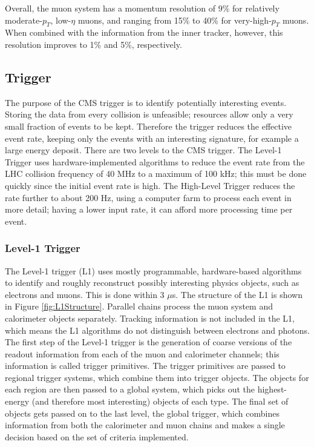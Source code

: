 Overall, the muon system has a momentum resolution 
of 9\% for relatively moderate-$p_T$, low-$\eta$ muons, 
and ranging from 15\% to 40\% for very-high-$p_T$ muons.  
When combined with the information from the inner tracker, 
however, this resolution improves to 
1\% and 5\%, respectively.  

\subsection{Trigger}
\label{exp:trigger}
The purpose of the CMS trigger is to 
identify potentially interesting events.  
Storing the data from every collision is unfeasible; 
resources allow only a very small fraction of events to be kept.  
Therefore the trigger reduces the effective event rate, 
keeping only the events with an interesting signature, 
for example a large energy deposit.  
There are two levels to the CMS trigger.  
The Level-1 Trigger uses hardware-implemented algorithms to 
reduce the event rate from the LHC collision frequency of 40 MHz 
to a maximum of 100 kHz; 
this must be done quickly since the initial event rate is high. 
The High-Level Trigger reduces the rate further to about 200 Hz, %
using a computer farm to process each event in more detail; 
having a lower input rate, it can afford more processing time per event.  


\subsubsection{Level-1 Trigger}
\label{exp:L1}

The Level-1 trigger (L1) \cite{TriggerTDR} 
uses mostly programmable, hardware-based algorithms 
to identify and roughly reconstruct possibly interesting physics objects, 
such as electrons and muons.  
This is done within 3 $\mu$s.  
The structure of the L1 is shown in Figure \ref{fig:L1Structure}.  
Parallel chains process the muon system and calorimeter objects separately. 
Tracking information is not included in the L1, 
which means the L1 algorithms do not distinguish 
between electrons and photons. 
The first step of the Level-1 trigger is the generation 
of coarse versions of the readout information 
from each of the muon and calorimeter channels; 
this information is called trigger primitives.  
The trigger primitives are passed to regional trigger systems, 
which combine them into trigger objects.  
The objects for each region are then passed to a global system, 
which picks out the highest-energy (and therefore most interesting) 
objects of each type.
The final set of objects gets passed on to the last level, 
the global trigger, which combines information from both 
the calorimeter and muon chains 
and makes a single decision based on the set of criteria implemented.  

